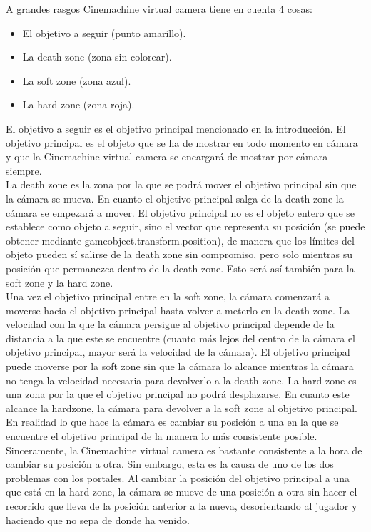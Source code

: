 A grandes rasgos Cinemachine virtual camera tiene en cuenta 4 cosas:
\begin{itemize}
\item
El objetivo a seguir (punto amarillo).
\item
La death zone (zona sin colorear).
\item
La soft zone (zona azul).
\item
La hard zone (zona roja).
\end{itemize}
El objetivo a seguir es el objetivo principal mencionado en la introducción. El objetivo principal es el objeto que se ha de mostrar en todo momento en cámara y que la Cinemachine virtual camera se encargará de mostrar por cámara siempre.\\
La death zone es la zona por la que se podrá mover el objetivo principal sin que la cámara se mueva. En cuanto el objetivo principal salga de la death zone la cámara se empezará a mover. El objetivo principal no es el objeto entero que se establece como objeto a seguir, sino el vector que representa su posición (se puede obtener mediante gameobject.transform.position), de manera que los límites del objeto pueden sí salirse de la death zone sin compromiso, pero solo mientras su posición que permanezca dentro de la death zone. Esto será así también para la soft zone y la hard zone.\\
Una vez el objetivo principal entre en la soft zone, la cámara comenzará a moverse hacia el objetivo principal hasta volver a meterlo en la death zone. La velocidad con la que la cámara persigue al objetivo principal depende de la distancia a la que este se encuentre (cuanto más lejos del centro de la cámara el objetivo principal, mayor será la velocidad de la cámara). El objetivo principal puede moverse por la soft zone sin que la cámara lo alcance mientras la cámara no tenga la velocidad necesaria para devolverlo a la death zone.
La hard zone es una zona por la que el objetivo principal no podrá desplazarse. En cuanto este alcance la hardzone, la cámara para devolver a la soft zone al objetivo principal. En realidad lo que hace la cámara es cambiar su posición a una en la que se encuentre el objetivo principal de la manera lo más consistente posible. Sinceramente, la Cinemachine virtual camera es bastante consistente a la hora de cambiar su posición a otra. Sin embargo, esta es la causa de uno de los dos problemas con los portales. Al cambiar la posición del objetivo principal a una que está en la hard zone, la cámara se mueve de una posición a otra sin hacer el recorrido que lleva de la posición anterior a la nueva, desorientando al jugador y haciendo que no sepa de donde ha venido.

